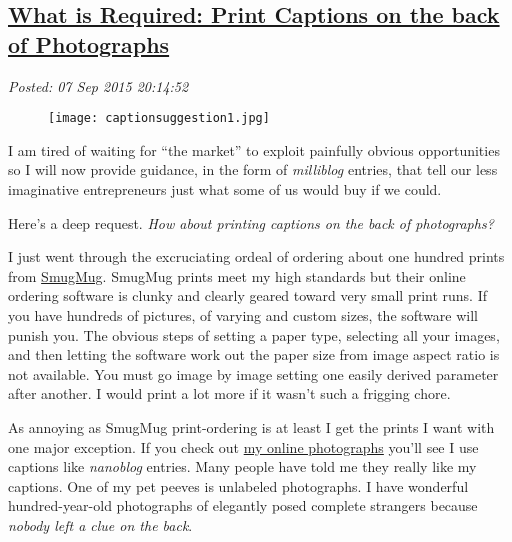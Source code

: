 %

\subsection*{\href{https://bakerjd99.wordpress.com/2015/09/07/what-is-required-print-captions-on-the-back-of-photographs/}{What is Required: Print Captions on the back of Photographs}}


\noindent\emph{Posted: 07 Sep 2015 20:14:52}
\vspace{6pt}

\captionsetup[figure]{labelformat=empty}
\begin{figure}[htbp]
\centering
\texttt{[image: captionsuggestion1.jpg]}
\label{fig:5162X0}
\end{figure}

I am tired of waiting for ``the market'' to exploit painfully obvious
opportunities so I will now provide guidance, in the form of
\emph{milliblog} entries, that tell our less imaginative entrepreneurs
just what some of us would buy if we could.

\medskip

Here's a deep request. \emph{How about printing captions on the back of
photographs?}

\medskip

I just went through the excruciating ordeal of ordering about one
hundred prints from \href{https://www.smugmug.com/}{SmugMug}. SmugMug
prints meet my high standards but their online ordering software is
clunky and clearly geared toward very small print runs. If you have
hundreds of pictures, of varying and custom sizes, the software will
punish you. The obvious steps of setting a paper type, selecting all
your images, and then letting the software work out the paper size from
image aspect ratio is not available. You must go image by image setting
one easily derived parameter after another. I would print a lot more if
it wasn't such a frigging chore.

As annoying as SmugMug print-ordering is at least I get the prints I
want with one major exception. If you check out
\href{https://conceptcontrol.smugmug.com/}{my online photographs} you'll
see I use captions like \emph{nanoblog} entries. Many people have told
me they really like my captions. One of my pet peeves is unlabeled
photographs. I have wonderful hundred-year-old photographs of elegantly
posed complete strangers because \emph{nobody left a clue on the back}.

